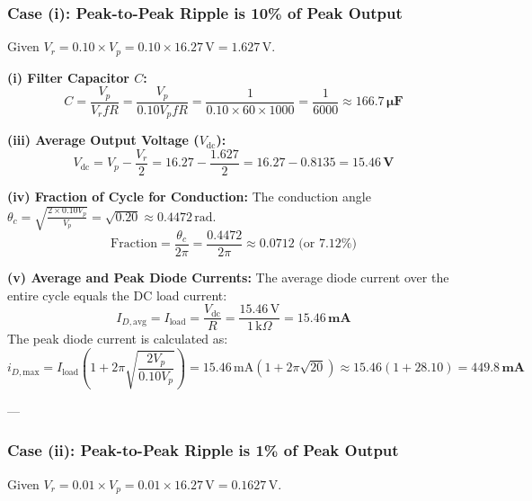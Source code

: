 \documentclass[12pt,a3paper]{article}
\begin{document}
\begin{enumerate}
\begin{tcolorbox}[enhanced,breakable,ansbox,colback=cA!4,colframe=cA,boxrule=0.8pt,arc=5pt,title={\textbf{Answer}},fonttitle=\bfseries\color{white},colbacktitle=cA]
\subsubsection*{Case (i): Peak-to-Peak Ripple is 10\% of Peak Output}

Given $V_r = 0.10 \times V_p = 0.10 \times 16.27\,\text{V} = 1.627\,\text{V}$.

\textbf{(i) Filter Capacitor $C$:}
\begin{equation}
    C = \frac{V_p}{V_r f R} = \frac{V_p}{0.10 V_p f R} = \frac{1}{0.10 \times 60 \times 1000} = \frac{1}{6000} \approx \mathbf{166.7\,\mu\text{F}}
\end{equation}

\textbf{(iii) Average Output Voltage ($V_{\text{dc}}$):}
\begin{equation}
    V_{\text{dc}} = V_p - \frac{V_r}{2} = 16.27 - \frac{1.627}{2} = 16.27 - 0.8135 = \mathbf{15.46\,\text{V}}
\end{equation}

\textbf{(iv) Fraction of Cycle for Conduction:}
The conduction angle $\theta_c = \sqrt{\frac{2 \times 0.10 V_p}{V_p}} = \sqrt{0.20} \approx 0.4472\,\text{rad}$.
\begin{equation}
    \text{Fraction} = \frac{\theta_c}{2\pi} = \frac{0.4472}{2\pi} \approx \mathbf{0.0712} \text{ (or } 7.12\%)
\end{equation}

\textbf{(v) Average and Peak Diode Currents:}
The average diode current over the entire cycle equals the DC load current:
\begin{equation}
    I_{D,\text{avg}} = I_{\text{load}} = \frac{V_{\text{dc}}}{R} = \frac{15.46\,\text{V}}{1\,\text{k}\Omega} = \mathbf{15.46\,\text{mA}}
\end{equation}
The peak diode current is calculated as:
\begin{equation}
    i_{D,\text{max}} = I_{\text{load}} \left( 1 + 2\pi \sqrt{\frac{2 V_p}{0.10 V_p}} \right) = 15.46\,\text{mA} \left( 1 + 2\pi \sqrt{20} \right) \approx 15.46 (1 + 28.10) = \mathbf{449.8\,\text{mA}}
\end{equation}

---

\subsubsection*{Case (ii): Peak-to-Peak Ripple is 1\% of Peak Output}

Given $V_r = 0.01 \times V_p = 0.01 \times 16.27\,\text{V} = 0.1627\,\text{V}$.


\end{tcolorbox}
\end{enumerate}
\end{document}
